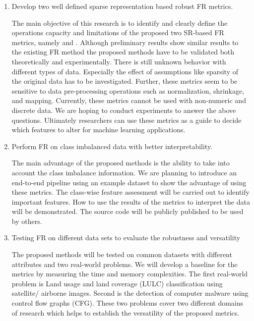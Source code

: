 \begin{enumerate}
    \item Develop two well defined sparse representation based robust FR metrics.
    
    The main objective of this research is to identify and clearly define the operations capacity and limitations of the proposed two SR-based FR metrics, namely  and . Although preliminary results show similar results to the existing FR method the proposed methods have to be validated both theoretically and experimentally. There is still unknown behavior with different types of data.  Especially the effect of assumptions like sparsity of the original data has to be investigated. Further, these metrics seem to be sensitive to data pre-processing operations such as normalization, shrinkage, and mapping. Currently, these metrics cannot be used with non-numeric and discrete data. We are hoping to conduct experiments to answer the above questions. Ultimately researchers can use these metrics as a guide to decide which features to alter for machine learning applications.
    
    \item Perform FR on class imbalanced data with better interpretability.
    
    The main advantage of the proposed methods is the ability to take into account the class imbalance information. We are planning to introduce an end-to-end pipeline using an example dataset to show the advantage of using these metrics. The class-wise feature assessment will be carried out to identify important features.  How to use the results of the metrics to interpret the data will be demonstrated. The source code will be publicly published to be used by others.
    
    \item Testing FR on different data sets to evaluate the robustness and versatility
    
    The proposed methods will be tested on common datasets with different attributes and two real-world problems. We will develop a baseline for the metrics by measuring the time and memory complexities. The first real-world problem is Land usage and land coverage (LULC) classification using satellite/ airborne images. Second is the detection of computer malware using control flow graphs (CFG). These two problems cover two different domains of research which helps to establish the versatility of the proposed metrics. 
    
\end{enumerate}


